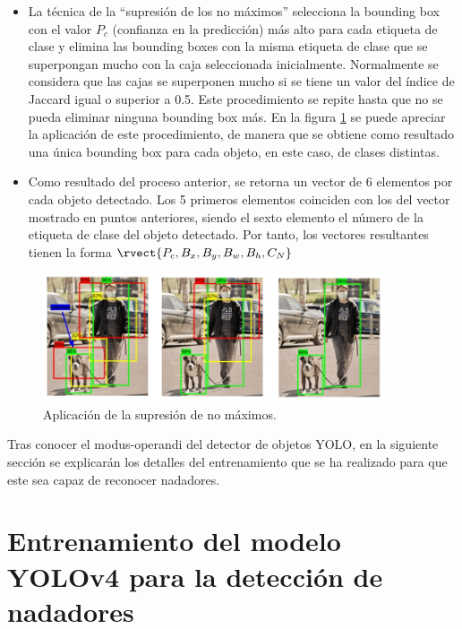 \begin{itemize}
    \item La técnica de la ``supresión de los no máximos'' selecciona la bounding box con el valor $P_c$ (confianza en la predicción) más alto para cada etiqueta de clase y elimina las bounding boxes con la misma etiqueta de clase que se superpongan mucho con la caja seleccionada inicialmente. Normalmente se considera que las cajas se superponen mucho si se tiene un valor del índice de Jaccard igual o superior a 0.5. Este procedimiento se repite hasta que no se pueda eliminar ninguna bounding box más. En la figura \ref{fig:yolonmsexample} se puede apreciar la aplicación de este procedimiento, de manera que se obtiene como resultado una única bounding box para cada objeto, en este caso, de clases distintas. 
    \item Como resultado del proceso anterior, se retorna un vector de 6 elementos por cada objeto detectado. Los 5 primeros elementos coinciden con los del vector mostrado en puntos anteriores, siendo el sexto elemento el número de la etiqueta de clase del objeto detectado. Por tanto, los vectores resultantes tienen la forma $\rvect{P_c,B_x, B_y,B_w,B_h,C_N}$ 
\end{itemize}

\begin{figure}[]
    \centering
    \includegraphics[width=0.9\textwidth,height=0.9\textheight,keepaspectratio]{imagenes/parte_IA/nms_yolo.jpg}    
    \caption{Aplicación de la supresión de no máximos.}
    \label{fig:yolonmsexample}
\end{figure}

Tras conocer el modus-operandi del detector de objetos YOLO, en la siguiente sección se explicarán los detalles del entrenamiento que se ha realizado para que este sea capaz de reconocer nadadores.

\section{Entrenamiento del modelo YOLOv4 para la detección de nadadores} 


